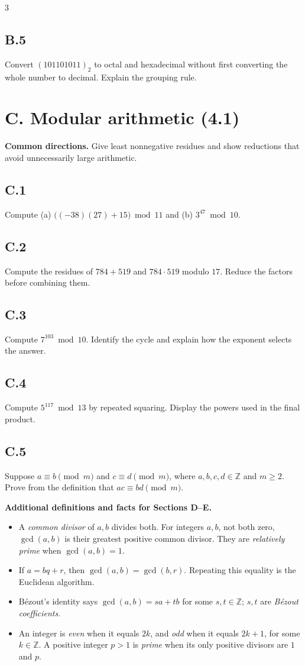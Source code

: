 \documentclass{article}
\newcommand{\problem}[1]{\par\subsection*{#1}}
\begin{document}
\begin{multicols*}{3}
\vfill
\problem{B.5}
Convert $(101101011)_2$ to octal and hexadecimal without first converting the
whole number to decimal. Explain the grouping rule.

\columnbreak

\section*{C. Modular arithmetic (4.1)}

\textbf{Common directions.} Give least nonnegative residues and show
reductions that avoid unnecessarily large arithmetic.

\problem{C.1}
Compute (a) $\bigl((-38)(27)+15\bigr)\bmod11$ and
(b) $3^{47}\bmod10$.

\vfill
\problem{C.2}
Compute the residues of $784+519$ and $784\cdot519$ modulo $17$. Reduce the
factors before combining them.

\vfill
\problem{C.3}
Compute $7^{103}\bmod10$. Identify the cycle and explain how the exponent
selects the answer.

\vfill
\problem{C.4}
Compute $5^{117}\bmod13$ by repeated squaring. Display the powers used in the
final product.

\vfill
\problem{C.5}
Suppose $a\equiv b\pmod m$ and $c\equiv d\pmod m$, where
$a,b,c,d\in\mathbb Z$ and $m\ge2$. Prove from the definition that
$ac\equiv bd\pmod m$.

\end{multicols*}

\clearpage

\begin{tcolorbox}
\small
\textbf{Additional definitions and facts for Sections D--E.}\par
\noindent\begin{minipage}[t]{0.485\linewidth}
\begin{itemize}
  \item A \emph{common divisor} of $a,b$ divides both. For integers $a,b$,
        not both zero, $\gcd(a,b)$ is their greatest positive common divisor.
        They are \emph{relatively prime} when $\gcd(a,b)=1$.
  \item If $a=bq+r$, then $\gcd(a,b)=\gcd(b,r)$. Repeating this equality is
        the Euclidean algorithm.
\end{itemize}
\end{minipage}\hfill%
\begin{minipage}[t]{0.485\linewidth}
\begin{itemize}
  \item B\'ezout's identity says $\gcd(a,b)=sa+tb$ for some
        $s,t\in\mathbb Z$; $s,t$ are \emph{B\'ezout coefficients}.
  \item An integer is \emph{even} when it equals $2k$, and \emph{odd} when it
        equals $2k+1$, for some $k\in\mathbb Z$. A positive integer $p>1$ is
        \emph{prime} when its only positive divisors are $1$ and $p$.
\end{itemize}
\end{minipage}
\end{tcolorbox}
\end{document}
